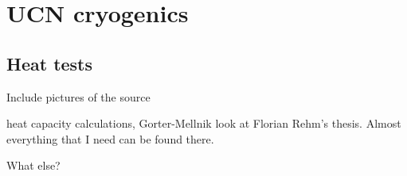 \chapter{UCN cryogenics}

\section{Heat tests}
\begin{description}
\item{Include pictures of the source}

\item{heat capacity calculations, Gorter-Mellnik } look at Florian
  Rehm's thesis. Almost everything that I need can be found there.
\item{What else?}
  
\end{description}
